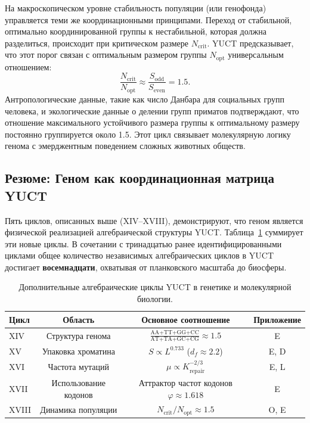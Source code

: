 \documentclass[12pt]{article}
\begin{document}
	На макроскопическом уровне стабильность популяции (или генофонда) управляется теми же координационными принципами. Переход от стабильной, оптимально координированной группы к нестабильной, которая должна разделиться, происходит при критическом размере $N_{\mathrm{crit}}$. YUCT предсказывает, что этот порог связан с оптимальным размером группы $N_{\mathrm{opt}}$ универсальным отношением:
	\begin{equation}
		\boxed{ \frac{N_{\mathrm{crit}}}{N_{\mathrm{opt}}} \approx \frac{S_{\mathrm{odd}}}{S_{\mathrm{even}}} = 1.5 }.
	\end{equation}
	Антропологические данные, такие как число Данбара для социальных групп человека, и экологические данные о делении групп приматов подтверждают, что отношение максимального устойчивого размера группы к оптимальному размеру постоянно группируется около 1.5. Этот цикл связывает молекулярную логику генома с эмерджентным поведением сложных животных обществ.
	
	\subsection{Резюме: Геном как координационная матрица YUCT}
	
	Пять циклов, описанных выше (XIV–XVIII), демонстрируют, что геном является физической реализацией алгебраической структуры YUCT. Таблица~\ref{tab:genetic-loops} суммирует эти новые циклы. В сочетании с тринадцатью ранее идентифицированными циклами общее количество независимых алгебраических циклов в YUCT достигает \textbf{восемнадцати}, охватывая от планковского масштаба до биосферы.
	
	\begin{table}[htbp]
		\centering
		\caption{Дополнительные алгебраические циклы YUCT в генетике и молекулярной биологии.}
		\label{tab:genetic-loops}
		\footnotesize
		\begin{tabular}{l c c c}
			\toprule
			\textbf{Цикл} & \textbf{Область} & \textbf{Основное соотношение} & \textbf{Приложение} \\
			\midrule
			XIV & Структура генома & \(\frac{\text{AA+TT+GG+CC}}{\text{AT+TA+GC+CG}} \approx 1.5\) & E \\
			XV & Упаковка хроматина & \(S \propto L^{0.733}\) (\(d_f \approx 2.2\)) & E, D \\
			XVI & Частота мутаций & \(\mu \propto K_{\mathrm{repair}}^{-2/3}\) & E, L \\
			XVII & Использование кодонов & Аттрактор частот кодонов \(\varphi \approx 1.618\) & E \\
			XVIII & Динамика популяции & \(N_{\mathrm{crit}}/N_{\mathrm{opt}} \approx 1.5\) & O, E \\
			\bottomrule
		\end{tabular}
	\end{table}
	
\end{document}

